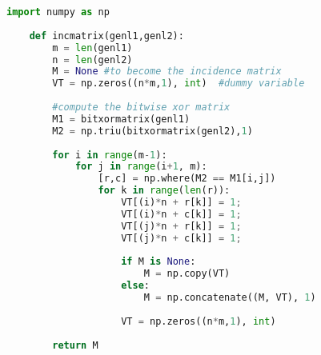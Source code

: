 \begin{lstlisting}[language=Python, caption=Python example]
    import numpy as np
     
    def incmatrix(genl1,genl2):
        m = len(genl1)
        n = len(genl2)
        M = None #to become the incidence matrix
        VT = np.zeros((n*m,1), int)  #dummy variable
     
        #compute the bitwise xor matrix
        M1 = bitxormatrix(genl1)
        M2 = np.triu(bitxormatrix(genl2),1) 
     
        for i in range(m-1):
            for j in range(i+1, m):
                [r,c] = np.where(M2 == M1[i,j])
                for k in range(len(r)):
                    VT[(i)*n + r[k]] = 1;
                    VT[(i)*n + c[k]] = 1;
                    VT[(j)*n + r[k]] = 1;
                    VT[(j)*n + c[k]] = 1;
     
                    if M is None:
                        M = np.copy(VT)
                    else:
                        M = np.concatenate((M, VT), 1)
     
                    VT = np.zeros((n*m,1), int)
     
        return M
\end{lstlisting}